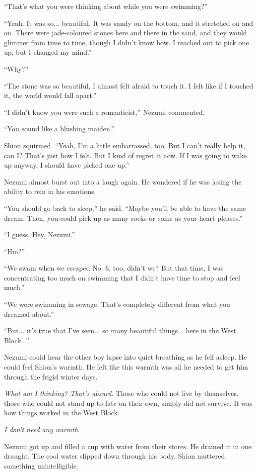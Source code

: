 ``That's what you were thinking about while you were swimming?''

``Yeah. It was so... beautiful. It was sandy on the bottom, and it
stretched on and on. There were jade-coloured stones here and there in
the sand, and they would glimmer from time to time, though I didn't know
how. I reached out to pick one up, but I changed my mind.''

``Why?''

``The stone was so beautiful, I almost felt afraid to touch it. I felt
like if I touched it, the world would fall apart.''

``I didn't know you were such a romanticist,'' Nezumi commented.~

``You sound like a blushing maiden.''

Shion squirmed. ``Yeah, I'm a little embarrassed, too. But I can't
really help it, can I? That's just how I felt. But I kind of regret it
now. If I was going to wake up anyway, I should have picked one up.''

Nezumi almost burst out into a laugh again. He wondered if he was losing
the ability to rein in his emotions.

``You should go back to sleep,'' he said. ``Maybe you'll be able to have
the same dream. Then, you could pick up as many rocks or coins as your
heart pleases.''

``I guess. Hey, Nezumi.''

``Hm?''

``We swam when we escaped No. 6, too, didn't we? But that time, I was
concentrating too much on swimming that I didn't have time to stop and
feel much.''

``We were swimming in sewage. That's completely different from what you
dreamed about.''

``But... it's true that I've seen... so many beautiful things... here in
the West Block...''

Nezumi could hear the other boy lapse into quiet breathing as he fell
asleep. He could feel Shion's warmth. He felt like this warmth was all
he needed to get him through the frigid winter days.

\emph{What am I thinking? That's absurd.} Those who could not live by
themselves, those who could not stand up to fate on their own, simply
did not survive. It was how things worked in the West Block.

\emph{I don't need any warmth.}

Nezumi got up and filled a cup with water from their stores. He drained
it in one draught. The cool water slipped down through his body. Shion
muttered something unintelligible.

